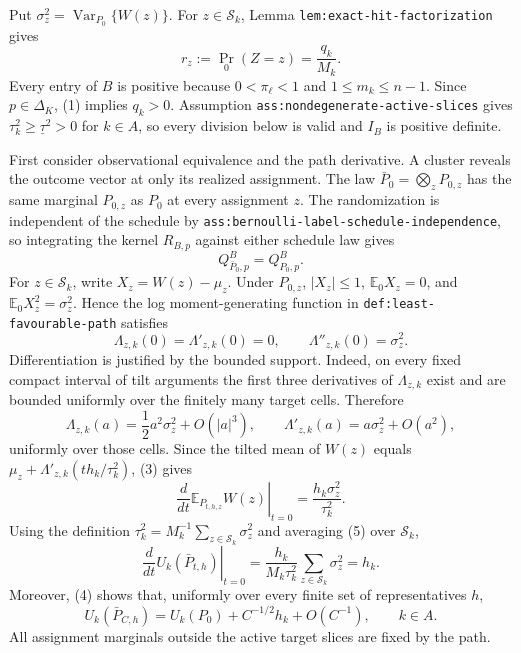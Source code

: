 Put \(\sigma_z^2=\operatorname{Var}_{P_0}\{W(z)\}\).  For \(z\in\mathcal S_k\), Lemma \texttt{lem:exact-hit-factorization} gives
\[
r_z:=\Pr_0(Z=z)=\frac{q_k}{M_k}.
\tag{1}
\]
Every entry of \(B\) is positive because \(0<\pi_\ell<1\) and \(1\leq m_k\leq n-1\).  Since \(p\in\Delta_K\), (1) implies \(q_k>0\).  Assumption \texttt{ass:nondegenerate-active-slices} gives \(\tau_k^2\geq\underline\tau^2>0\) for \(k\in A\), so every division below is valid and \(I_B\) is positive definite.

First consider observational equivalence and the path derivative.  A cluster reveals the outcome vector at only its realized assignment.  The law \(\bar P_0=\bigotimes_zP_{0,z}\) has the same marginal \(P_{0,z}\) as \(P_0\) at every assignment \(z\).  The randomization is independent of the schedule by \texttt{ass:bernoulli-label-schedule-independence}, so integrating the kernel \(R_{B,p}\) against either schedule law gives
\[
Q^B_{\bar P_0,p}=Q^B_{P_0,p}.
\tag{2}
\]
For \(z\in\mathcal S_k\), write \(X_z=W(z)-\mu_z\).  Under \(P_{0,z}\), \(|X_z|\leq1\), \(\mathbb E_0X_z=0\), and \(\mathbb E_0X_z^2=\sigma_z^2\).  Hence the log moment-generating function in \texttt{def:least-favourable-path} satisfies
\[
\Lambda_{z,k}(0)=\Lambda'_{z,k}(0)=0,
\qquad
\Lambda''_{z,k}(0)=\sigma_z^2.
\tag{3}
\]
Differentiation is justified by the bounded support.  Indeed, on every fixed compact interval of tilt arguments the first three derivatives of \(\Lambda_{z,k}\) exist and are bounded uniformly over the finitely many target cells.  Therefore
\[
\Lambda_{z,k}(a)=\frac12a^2\sigma_z^2+O(|a|^3),
\qquad
\Lambda'_{z,k}(a)=a\sigma_z^2+O(a^2),
\tag{4}
\]
uniformly over those cells.  Since the tilted mean of \(W(z)\) equals \(\mu_z+\Lambda'_{z,k}(t h_k/\tau_k^2)\), (3) gives
\[
\left.\frac{d}{dt}\mathbb E_{P_{t,h,z}}W(z)\right|_{t=0}
=\frac{h_k\sigma_z^2}{\tau_k^2}.
\tag{5}
\]
Using the definition \(\tau_k^2=M_k^{-1}\sum_{z\in\mathcal S_k}\sigma_z^2\) and averaging (5) over \(\mathcal S_k\),
\[
\left.\frac{d}{dt}U_k(\bar P_{t,h})\right|_{t=0}
=\frac{h_k}{M_k\tau_k^2}\sum_{z\in\mathcal S_k}\sigma_z^2
=h_k.
\tag{6}
\]
Moreover, (4) shows that, uniformly over every finite set of representatives \(h\),
\[
U_k(\bar P_{C,h})=U_k(P_0)+C^{-1/2}h_k+O(C^{-1}),
\qquad k\in A.
\tag{7}
\]
All assignment marginals outside the active target slices are fixed by the path.

